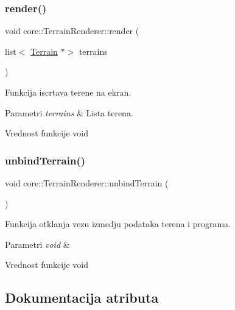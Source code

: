 \subsubsection{\texorpdfstring{render()}{render()}}
{\footnotesize\ttfamily void core\+::\+Terrain\+Renderer\+::render (\begin{DoxyParamCaption}\item[{list$<$ \hyperlink{classterrain_1_1Terrain}{Terrain} $\ast$$>$}]{terrains }\end{DoxyParamCaption})}



Funkcija iscrtava terene na ekran. 


\begin{DoxyParams}{Parametri}
{\em terrains} & Lista terena. \\
\hline
\end{DoxyParams}
\begin{DoxyReturn}{Vrednost funkcije}
void 
\end{DoxyReturn}
\mbox{\label{classcore_1_1TerrainRenderer_ac739a96169a8fef7bfad56bbe3367962}} 
\subsubsection{\texorpdfstring{unbind\+Terrain()}{unbindTerrain()}}
{\footnotesize\ttfamily void core\+::\+Terrain\+Renderer\+::unbind\+Terrain (\begin{DoxyParamCaption}{ }\end{DoxyParamCaption})}



Funkcija otklanja vezu izmedju podataka terena i programa. 


\begin{DoxyParams}{Parametri}
{\em void} & \\
\hline
\end{DoxyParams}
\begin{DoxyReturn}{Vrednost funkcije}
void 
\end{DoxyReturn}


\subsection{Dokumentacija atributa}
\mbox{\label{classcore_1_1TerrainRenderer_abc56752e01a0b9b0ebfd57b8daa6172c}} 
